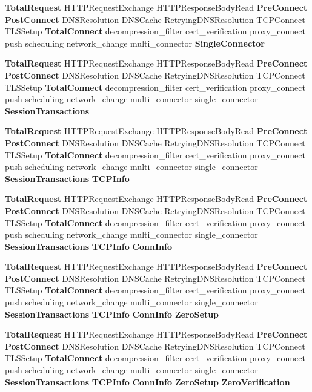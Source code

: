 \begin{DoxyCompactItemize}
{\bf Total\+Request} H\+T\+T\+P\+Request\+Exchange H\+T\+T\+P\+Response\+Body\+Read {\bf Pre\+Connect} {\bf Post\+Connect} D\+N\+S\+Resolution D\+N\+S\+Cache Retrying\+D\+N\+S\+Resolution T\+C\+P\+Connect T\+L\+S\+Setup {\bf Total\+Connect} decompression\+\_\+filter cert\+\_\+verification proxy\+\_\+connect push scheduling network\+\_\+change multi\+\_\+connector {\bf Single\+Connector}
\item 
{\bf Total\+Request} H\+T\+T\+P\+Request\+Exchange H\+T\+T\+P\+Response\+Body\+Read {\bf Pre\+Connect} {\bf Post\+Connect} D\+N\+S\+Resolution D\+N\+S\+Cache Retrying\+D\+N\+S\+Resolution T\+C\+P\+Connect T\+L\+S\+Setup {\bf Total\+Connect} decompression\+\_\+filter cert\+\_\+verification proxy\+\_\+connect push scheduling network\+\_\+change multi\+\_\+connector single\+\_\+connector {\bf Session\+Transactions}
\item 
{\bf Total\+Request} H\+T\+T\+P\+Request\+Exchange H\+T\+T\+P\+Response\+Body\+Read {\bf Pre\+Connect} {\bf Post\+Connect} D\+N\+S\+Resolution D\+N\+S\+Cache Retrying\+D\+N\+S\+Resolution T\+C\+P\+Connect T\+L\+S\+Setup {\bf Total\+Connect} decompression\+\_\+filter cert\+\_\+verification proxy\+\_\+connect push scheduling network\+\_\+change multi\+\_\+connector single\+\_\+connector {\bf Session\+Transactions} {\bf T\+C\+P\+Info}
\item 
{\bf Total\+Request} H\+T\+T\+P\+Request\+Exchange H\+T\+T\+P\+Response\+Body\+Read {\bf Pre\+Connect} {\bf Post\+Connect} D\+N\+S\+Resolution D\+N\+S\+Cache Retrying\+D\+N\+S\+Resolution T\+C\+P\+Connect T\+L\+S\+Setup {\bf Total\+Connect} decompression\+\_\+filter cert\+\_\+verification proxy\+\_\+connect push scheduling network\+\_\+change multi\+\_\+connector single\+\_\+connector {\bf Session\+Transactions} {\bf T\+C\+P\+Info} {\bf Conn\+Info}
\item 
{\bf Total\+Request} H\+T\+T\+P\+Request\+Exchange H\+T\+T\+P\+Response\+Body\+Read {\bf Pre\+Connect} {\bf Post\+Connect} D\+N\+S\+Resolution D\+N\+S\+Cache Retrying\+D\+N\+S\+Resolution T\+C\+P\+Connect T\+L\+S\+Setup {\bf Total\+Connect} decompression\+\_\+filter cert\+\_\+verification proxy\+\_\+connect push scheduling network\+\_\+change multi\+\_\+connector single\+\_\+connector {\bf Session\+Transactions} {\bf T\+C\+P\+Info} {\bf Conn\+Info} {\bf Zero\+Setup}
\item 
{\bf Total\+Request} H\+T\+T\+P\+Request\+Exchange H\+T\+T\+P\+Response\+Body\+Read {\bf Pre\+Connect} {\bf Post\+Connect} D\+N\+S\+Resolution D\+N\+S\+Cache Retrying\+D\+N\+S\+Resolution T\+C\+P\+Connect T\+L\+S\+Setup {\bf Total\+Connect} decompression\+\_\+filter cert\+\_\+verification proxy\+\_\+connect push scheduling network\+\_\+change multi\+\_\+connector single\+\_\+connector {\bf Session\+Transactions} {\bf T\+C\+P\+Info} {\bf Conn\+Info} {\bf Zero\+Setup} {\bf Zero\+Verification}

\end{DoxyCompactItemize}
